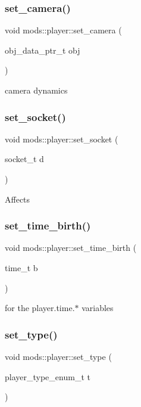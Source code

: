 \subsubsection{\texorpdfstring{set\+\_\+camera()}{set\_camera()}}
{\footnotesize\ttfamily void mods\+::player\+::set\+\_\+camera (\begin{DoxyParamCaption}\item[{obj\+\_\+data\+\_\+ptr\+\_\+t}]{obj }\end{DoxyParamCaption})}

camera dynamics \mbox{\label{classmods_1_1player_ad5c902bb8d73713f04628ca8988c128a}} 
\subsubsection{\texorpdfstring{set\+\_\+socket()}{set\_socket()}}
{\footnotesize\ttfamily void mods\+::player\+::set\+\_\+socket (\begin{DoxyParamCaption}\item[{socket\+\_\+t}]{d }\end{DoxyParamCaption})}

Affects \mbox{\label{classmods_1_1player_ac40139396e5026382a297640fa5d57d2}} 
\subsubsection{\texorpdfstring{set\+\_\+time\+\_\+birth()}{set\_time\_birth()}}
{\footnotesize\ttfamily void mods\+::player\+::set\+\_\+time\+\_\+birth (\begin{DoxyParamCaption}\item[{time\+\_\+t}]{b }\end{DoxyParamCaption})}

for the player.\+time.$\ast$ variables \mbox{\label{classmods_1_1player_a75e7ab6e28ec637e3d1a8f905162bf3e}} 
\subsubsection{\texorpdfstring{set\+\_\+type()}{set\_type()}}
{\footnotesize\ttfamily void mods\+::player\+::set\+\_\+type (\begin{DoxyParamCaption}\item[{player\+\_\+type\+\_\+enum\+\_\+t}]{t }\end{DoxyParamCaption})}

